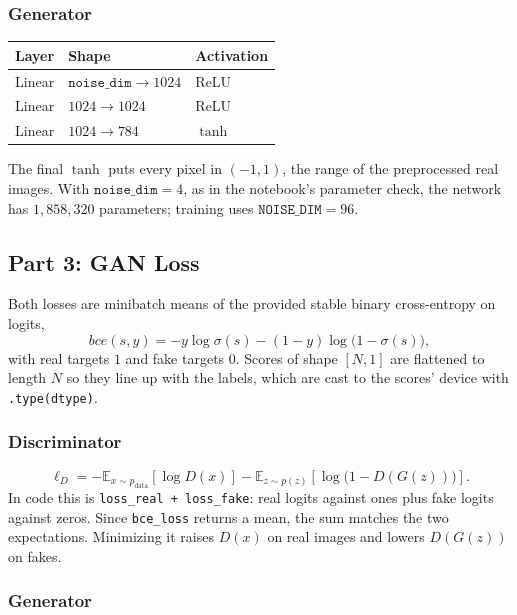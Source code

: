 \subsubsection{Generator}

\begin{center}
\begin{tabular}{lll}
\toprule
Layer & Shape & Activation \\
\midrule
Linear & \(\texttt{noise\_dim} \to 1024\) & ReLU \\
Linear & \(1024 \to 1024\) & ReLU \\
Linear & \(1024 \to 784\) & \(\tanh\) \\
\bottomrule
\end{tabular}
\end{center}
The final \(\tanh\) puts every pixel in \((-1,1)\), the range of the preprocessed real images. With \(\texttt{noise\_dim} = 4\), as in the notebook's parameter check, the network has \(1{,}858{,}320\) parameters; training uses \(\texttt{NOISE\_DIM} = 96\).

\subsection{Part 3: GAN Loss}

Both losses are minibatch means of the provided stable binary cross-entropy on logits,
\[
  bce(s, y) = -y \log \sigma(s) - (1-y)\log\bigl(1-\sigma(s)\bigr),
\]
with real targets \(1\) and fake targets \(0\). Scores of shape \([N, 1]\) are flattened to length \(N\) so they line up with the labels, which are cast to the scores' device with \texttt{.type(dtype)}.

\subsubsection{Discriminator}

\[
  \ell_D
  = -\mathbb{E}_{x \sim p_{\mathrm{data}}}\!\left[\log D(x)\right]
  - \mathbb{E}_{z \sim p(z)}\!\left[\log \bigl(1 - D(G(z))\bigr)\right].
\]
In code this is \texttt{loss\_real + loss\_fake}: real logits against ones plus fake logits against zeros. Since \texttt{bce\_loss} returns a mean, the sum matches the two expectations. Minimizing it raises \(D(x)\) on real images and lowers \(D(G(z))\) on fakes.

\subsubsection{Generator}


